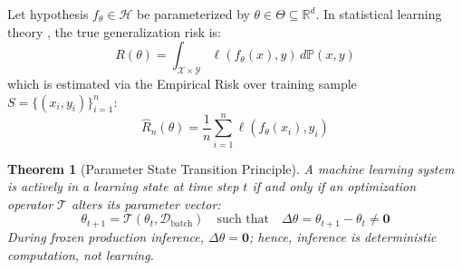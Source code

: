 \documentclass[11pt,a4paper]{article}
\theoremstyle{definition}
\theoremstyle{plain}
\newtheorem{theorem}{Theorem}[section]
\theoremstyle{remark}
\newcommand{\R}{\mathbb{R}}
\begin{document}
Let hypothesis $f_\theta \in \mathcal{H}$ be parameterized by $\theta \in \Theta \subseteq \R^d$. In statistical learning theory \cite{vapnik1998statistical}, the true generalization risk is:
\begin{equation}
R(\theta) = \int_{\mathcal{X} \times \mathcal{Y}} \ell(f_\theta(x), y) \, d\mathbb{P}(x, y)
\end{equation}
which is estimated via the Empirical Risk over training sample $S = \{(x_i, y_i)\}_{i=1}^n$:
\begin{equation}
\hat{R}_n(\theta) = \frac{1}{n} \sum_{i=1}^n \ell(f_\theta(x_i), y_i)
\end{equation}

\begin{theorem}[Parameter State Transition Principle]
A machine learning system is actively in a learning state at time step $t$ if and only if an optimization operator $\mathcal{T}$ alters its parameter vector:
\begin{equation}
\theta_{t+1} = \mathcal{T}(\theta_t, \mathcal{D}_{\mathrm{batch}}) \quad \text{such that} \quad \Delta \theta = \theta_{t+1} - \theta_t \neq \mathbf{0}
\end{equation}
During frozen production inference, $\Delta \theta = \mathbf{0}$; hence, inference is deterministic computation, not learning.
\end{theorem}
\end{document}
